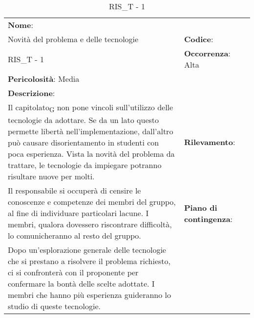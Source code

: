 \renewcommand{\arraystretch}{1.5}
\begin{longtable} { 
		>{\raggedright}p{} 
		>{\raggedright}p{} 
		>{\raggedright}p{}    }
		
		\caption{RIS\_T - 1} \endhead	


	\textbf{Nome}: \\ Novità del problema e delle tecnologie
	& \textbf{Codice}: \\ RIS\_T - 1  
	& \textbf{Occorrenza}: Alta \\ \textbf{Pericolosità}: Media
	
	\tabularnewline
	
	\textbf{Descrizione}: \\ Il capitolato\textsubscript{G} non pone vincoli sull'utilizzo delle tecnologie da adottare. Se da un lato questo permette libertà nell'implementazione, dall'altro può causare disorientamento in studenti con poca esperienza. Vista la novità del problema da trattare, le tecnologie da impiegare potranno risultare nuove per molti.
	& 
	\textbf{Rilevamento}: \\ Il responsabile si occuperà di censire le conoscenze e competenze dei membri del gruppo, al fine di individuare particolari lacune. I membri, qualora dovessero riscontrare difficoltà, lo comunicheranno al resto del gruppo. 	
	&  
	\textbf{Piano di contingenza}: \\ Dopo un'esplorazione generale delle tecnologie che si prestano a risolvere il problema richiesto, ci si confronterà con il proponente per confermare la bontà delle scelte adottate. I membri che hanno più esperienza guideranno lo studio di queste tecnologie.

\end{longtable}

\newpage



